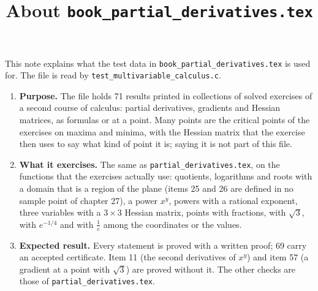 \documentclass[11pt,a4paper]{article}
\title{About \texttt{book\_partial\_derivatives.tex}}
\author{}
\date{}
\begin{document}
\maketitle
This note explains what the test data in \texttt{book\_partial\_derivatives.tex} is used for. The file is read by \texttt{test\_multivariable\_calculus.c}.

\begin{enumerate}
\item \textbf{Purpose.} The file holds 71 results printed in collections of solved exercises of a second course of calculus: partial derivatives, gradients and Hessian matrices, as formulas or at a point. Many points are the critical points of the exercises on maxima and minima, with the Hessian matrix that the exercise then uses to say what kind of point it is; saying it is not part of this file.

\item \textbf{What it exercises.} The same as \texttt{partial\_derivatives.tex}, on the functions that the exercises actually use: quotients, logarithms and roots with a domain that is a region of the plane (items 25 and 26 are defined in no sample point of chapter 27), a power $x^{y}$, powers with a rational exponent, three variables with a $3 \times 3$ Hessian matrix, points with fractions, with $\sqrt{3}$, with $e^{-1/4}$ and with $\frac{1}{e}$ among the coordinates or the values.

\item \textbf{Expected result.} Every statement is proved with a written proof; 69 carry an accepted certificate. Item 11 (the second derivatives of $x^{y}$) and item 57 (a gradient at a point with $\sqrt{3}$) are proved without it. The other checks are those of \texttt{partial\_derivatives.tex}.


\end{enumerate}
\end{document}
